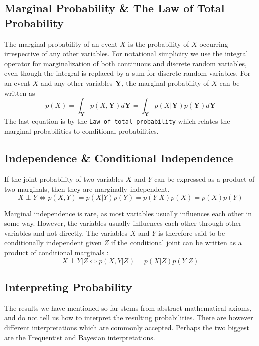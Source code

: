 \subsection{Marginal Probability \& The Law of Total Probability}
The marginal probability of an event $X$ is the probability of $X$ occurring irrespective of any other variables.
For notational simplicity we use the integral operator for marginalization of both continuous and discrete random variables, even though the integral is replaced by a sum for discrete random variables. For an event $X$ and any other variables $\bf Y$, the marginal probability of $X$ can be written as
\begin{equation}
    p(X) = \int_{\boldsymbol{Y}} p(X, \boldsymbol{Y}) d\boldsymbol{Y} = \int_{\boldsymbol{Y}} p(X | \boldsymbol{Y}) p(\boldsymbol{Y}) d\boldsymbol{Y}
\end{equation}
The last equation is by the \texttt{Law of total probability} which relates the marginal probabilities to conditional probabilities.

\subsection{Independence \& Conditional Independence}
If the joint probability of two variables $X$ and $Y$ can be expressed as a product of two marginals, then they are marginally independent.
\begin{equation}
    X \perp Y \iff p(X, Y) = p(X | Y)p(Y) = p(Y | X)p(X) = p(X)p(Y)
\end{equation}

Marginal independence is rare, as most variables usually influences each other in some way. However, the variables usually influences each other through other variables and not directly. The variables $X$ and $Y$ is therefore said to be conditionally independent given $Z$ if the conditional joint can be written as a product of conditional marginals \cite[p.~31]{murphy}:
\begin{equation}\label{eq:conditional_independence}
    X \perp Y | Z \iff p(X, Y | Z) = p(X | Z)p(Y | Z)
\end{equation}

\subsection{Interpreting Probability}
The results we have mentioned so far stems from abstract mathematical axioms, and do not tell us how to interpret the resulting probabilities. There are however different interpretations which are commonly accepted. Perhaps the two biggest are the Frequentist and Bayesian interpretations. 

